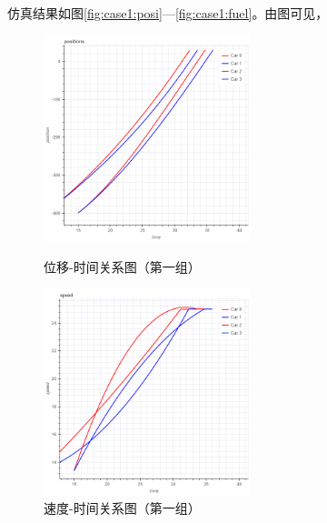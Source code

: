 仿真结果如图\ref{fig:case1:posi}---\ref{fig:case1:fuel}。由图可见，
\begin{figure}[htbp]
\begin{minipage}{0.48\textwidth}
  \centering
  \includegraphics[height=6cm]{figures/sim_case1/posi.png}
  \caption{位移-时间关系图（第一组）}
  \label{fig:case1:posi}
\end{minipage}\hfill
\begin{minipage}{0.48\textwidth}
  \centering
  \includegraphics[height=6cm]{figures/sim_case1/speed.png}
  \caption{速度-时间关系图（第一组）}
  \label{fig:case1:speed}
\end{minipage}
\end{figure}
